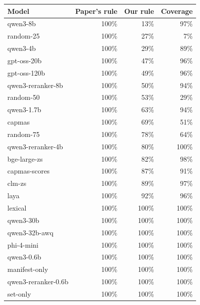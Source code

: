\begin{tabular}{lrrr}
\toprule
Model & Paper's rule & Our rule & Coverage \\
\midrule
qwen3-8b & 100\% & 13\% & 97\% \\
random-25 & 100\% & 27\% & 7\% \\
qwen3-4b & 100\% & 29\% & 89\% \\
gpt-oss-20b & 100\% & 47\% & 96\% \\
gpt-oss-120b & 100\% & 49\% & 96\% \\
qwen3-reranker-8b & 100\% & 50\% & 94\% \\
random-50 & 100\% & 53\% & 29\% \\
qwen3-1.7b & 100\% & 63\% & 94\% \\
capmas & 100\% & 69\% & 51\% \\
random-75 & 100\% & 78\% & 64\% \\
qwen3-reranker-4b & 100\% & 80\% & 100\% \\
bge-large-zs & 100\% & 82\% & 98\% \\
capmas-scores & 100\% & 87\% & 91\% \\
clm-zs & 100\% & 89\% & 97\% \\
laya & 100\% & 92\% & 96\% \\
lexical & 100\% & 100\% & 100\% \\
qwen3-30b & 100\% & 100\% & 100\% \\
qwen3-32b-awq & 100\% & 100\% & 100\% \\
phi-4-mini & 100\% & 100\% & 100\% \\
qwen3-0.6b & 100\% & 100\% & 100\% \\
manifest-only & 100\% & 100\% & 100\% \\
qwen3-reranker-0.6b & 100\% & 100\% & 100\% \\
set-only & 100\% & 100\% & 100\% \\
\bottomrule
\end{tabular}
